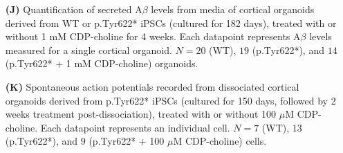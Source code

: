 \begin{itemize}
    \item[\textbf{(J)}] Quantification of secreted A$\beta$ levels from media of cortical organoids derived from WT or p.Tyr622* iPSCs (cultured for 182 days), treated with or without 1 mM CDP-choline for 4 weeks. Each datapoint represents A$\beta$ levels measured for a single cortical organoid. $N=20$ (WT), $19$ (p.Tyr622*), and $14$ (p.Tyr622* + 1 mM CDP-choline) organoids.
    \item[\textbf{(K)}] Spontaneous action potentials recorded from dissociated cortical organoids derived from p.Tyr622* iPSCs (cultured for 150 days, followed by 2 weeks treatment post-dissociation), treated with or without 100 $\mu$M CDP-choline. Each datapoint represents an individual cell. $N=7$ (WT), $13$ (p.Tyr622*), and $9$ (p.Tyr622* + 100 $\mu$M CDP-choline) cells.
\end{itemize}